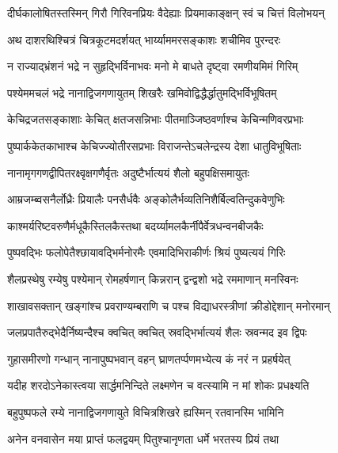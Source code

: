 
\twolineshloka
{दीर्घकालोषितस्तस्मिन् गिरौ गिरिवनप्रियः}
{वैदेह्याः प्रियमाकाङ्क्षन् स्वं च चित्तं विलोभयन्} %

\twolineshloka
{अथ दाशरथिश्चित्रं चित्रकूटमदर्शयत्}
{भार्य्याममरसङ्काशः शचीमिव पुरन्दरः} %

\twolineshloka
{न राज्याद्भ्रंशनं भद्रे न सुहृद्भिर्विनाभवः}
{मनो मे बाधते दृष्ट्वा रमणीयमिमं गिरिम्} %

\twolineshloka
{पश्येममचलं भद्रे नानाद्विजगणायुतम्}
{शिखरैः खमिवोद्विद्धैर्द्धातुमद्भिर्विभूषितम्} %

\twolineshloka
{केचिद्रजतसङ्काशाः केचित् क्षतजसन्निभाः}
{पीतमाञ्जिष्ठवर्णाश्च केचिन्मणिवरप्रभाः} %

\twolineshloka
{पुष्पार्ककेतकाभाश्च केचिज्ज्योतीरसप्रभाः}
{विराजन्तेऽचलेन्द्रस्य देशा धातुविभूषिताः} %

\twolineshloka
{नानामृगगणद्वीपितरक्ष्वृक्षगणैर्वृतः}
{अदुष्टैर्भात्ययं शैलो बहुपक्षिसमायुतः} %

\twolineshloka
{आम्रजम्ब्वसनैर्लोध्रैः प्रियालैः पनसैर्धवैः}
{अङ्कोलैर्भव्यतिनिशैर्बिल्वतिन्दुकवेणुभिः} %

\twolineshloka
{काश्मर्यरिष्टवरुणैर्मधूकैस्तिलकैस्तथा}
{बदर्य्यामलकैर्नीपैर्वेत्रधन्वनबीजकैः} %

\twolineshloka
{पुष्पवद्भिः फलोपेतैश्छायावद्भिर्मनोरमैः}
{एवमादिभिराकीर्णः श्रियं पुष्यत्ययं गिरिः} %

\twolineshloka
{शैलप्रस्थेषु रम्येषु पश्येमान् रोमहर्षणान्}
{किन्नरान् द्वन्द्वशो भद्रे रममाणान् मनस्विनः} %

\twolineshloka
{शाखावसक्तान् खङ्गांश्च प्रवराण्यम्बराणि च}
{पश्च विद्याधरस्त्रीणां क्रीडोद्देशान् मनोरमान्} %

\twolineshloka
{जलप्रपातैरुद्भेदैर्निष्यन्दैश्च क्वचित् क्वचित्}
{स्रवद्भिर्भात्ययं शैलः स्रवन्मद इव द्विपः} %

\twolineshloka
{गुहासमीरणो गन्धान् नानापुष्पभवान् वहन्}
{घ्राणतर्प्पणमभ्येत्य कं नरं न प्रहर्षयेत्} %

\twolineshloka
{यदीह शरदोऽनेकास्त्वया सार्द्धमनिन्दिते}
{लक्ष्मणेन च वत्स्यामि न मां शोकः प्रधक्ष्यति} %

\twolineshloka
{बहुपुष्पफले रम्ये नानाद्विजगणायुते}
{विचित्रशिखरे ह्यस्मिन् रतवानस्मि भामिनि} %

\twolineshloka
{अनेन वनवासेन मया प्राप्तं फलद्वयम्}
{पितुश्चानृणता धर्मे भरतस्य प्रियं तथा} %

